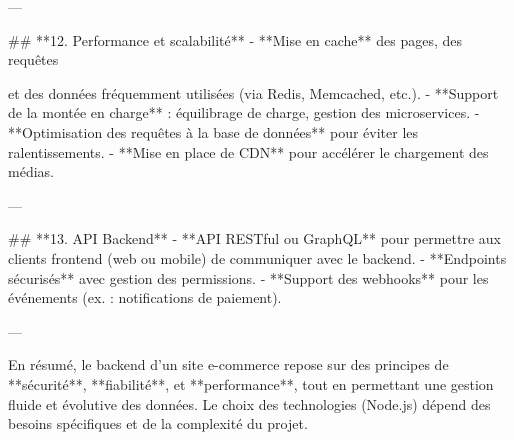 ---

## **12. Performance et scalabilité**
- **Mise en cache** des pages, des requêtes

et des données fréquemment utilisées (via Redis, Memcached, etc.).  
- **Support de la montée en charge** : équilibrage de charge, gestion des microservices.  
- **Optimisation des requêtes à la base de données** pour éviter les ralentissements.  
- **Mise en place de CDN** pour accélérer le chargement des médias.  

---

## **13. API Backend**
- **API RESTful ou GraphQL** pour permettre aux clients frontend (web ou mobile) de communiquer avec le backend.  
- **Endpoints sécurisés** avec gestion des permissions.  
- **Support des webhooks** pour les événements (ex. : notifications de paiement).  

---

En résumé, le backend d’un site e-commerce repose sur des principes de **sécurité**, **fiabilité**, et **performance**, tout en permettant une gestion fluide et évolutive des données. Le choix des technologies (Node.js) dépend des besoins spécifiques et de la complexité du projet.